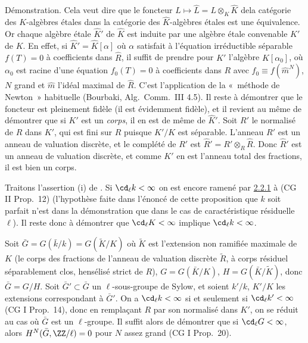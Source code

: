\documentclass[10pt]{../fichiers-configuration-latex/smfart}
\begin{document}
Démonstration. Cela veut dire que le foncteur $L\mapsto
\widehat{L}=L\otimes_K \widehat{K}$ de\pageoriginale la catégorie des
$K$-algèbres étales dans la catégorie des $\widehat{K}$-algèbres
étales est une équivalence. Or chaque algèbre étale $\widehat{K}'$ de
$\widehat{K}$ est induite par une algèbre étale convenable $K'$ de
$K$. En effet, si $\widehat{K}'=\widehat{K}[\alpha]$ où $\alpha$
satisfait à l'équation irréductible séparable $f(T)=0$ à coefficients
dans $\widehat{R}$, il suffit de prendre pour $K'$ l'algèbre 
$K[\alpha_0]$, où $\alpha_0$ est racine d'une équation $f_0(T)=0$ à
coefficients dans $R$ avec $f_0\equiv f(\widehat{m}^N)$, $N$ grand et
$\widehat{m}$ l'idéal maximal de $\widehat{R}$. C'est l'application de
la « méthode de Newton » habituelle (Bourbaki, Alg.~Comm.~III
4.5). Il reste à démontrer que le foncteur est pleinement fidèle (il
est évidemment fidèle), et il revient au même de démontrer que si $K'$
est un \emph{corps}, il en est de même de $\widehat{K}'$. Soit $R'$ le
normalisé de $R$ dans $K'$, qui est fini sur $R$ puisque $K'/K$ est
séparable. L'anneau $R'$ est un anneau de valuation discrète, et le
complété de $R'$ est $\widehat{R}'=R'\otimes_R \widehat{R}$. Donc
$\widehat{R}'$ est un anneau de valuation discrète, et comme $K'$ en
est l'anneau total des fractions, il est bien un corps.

Traitons l'assertion (i) de .
Si $\cd_{\ell}k<\infty$ on est encore ramené par \hyperref[X.lem2.2.1]{2.2.1}
à (CG II Prop.~12) (l'hypothèse faite dans l'énoncé
de cette proposition que $k$ soit parfait n'est  dans la
démonstration que dans le cas de caractéristique résiduelle
$\ell$). Il reste donc à démontrer que $\cd_{\ell}K<\infty$ implique
$\cd_{\ell}k<\infty$.

Soit $\bar{G}=G(\bar{k}/k)=G(\widetilde{K}/K)$ où $\widetilde{K}$ est
l'extension non ramifiée maximale de $K$ (\ie le corps des fractions
de l'anneau de valuation discrète $\widetilde{R}$, à corps résiduel
séparablement clos, hensélisé strict de $R$), $G=G(\bar{K}/K)$,
$H=G(\bar{K}/\widetilde{K})$, donc $\bar{G}=G/H$. Soit
$\bar{G}'\subset \bar{G}$ un $\ell$-sous-groupe de Sylow, et soient
$k'/k$, $K'/K$ les extensions correspondant à $\bar{G}'$. On a
$\cd_{\ell}k<\infty$ si et seulement si $\cd_{\ell}k'<\infty$ (CG I
Prop.~14), donc en remplaçant $R$ par son normalisé dans $K'$, on
se réduit au cas où $\bar{G}$ est un $\ell$-groupe. Il suffit alors de
démontrer que si $\cd_{\ell}G<\infty$, alors
$H^N(\bar{G},\ZZ/\ell)=0$ pour $N$ assez grand (CG
I Prop.~20).
\end{document}
